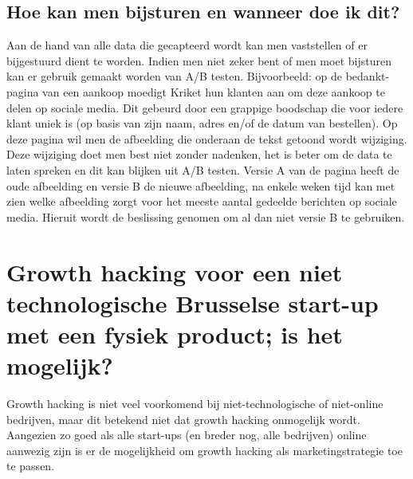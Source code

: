 \subsection{Hoe kan men bijsturen en wanneer doe ik dit?}
\label{subsec:growth-hack-bijsturen}
Aan de hand van alle data die gecapteerd wordt kan men vaststellen of er bijgestuurd dient te worden. Indien men niet zeker bent of men moet bijsturen kan er gebruik gemaakt worden van A/B testen. Bijvoorbeeld: op de bedankt-pagina van een aankoop moedigt Kriket hun klanten aan om deze aankoop te delen op sociale media. Dit gebeurd door een grappige boodschap die voor iedere klant uniek is (op basis van zijn naam, adres en/of de datum van bestellen). Op deze pagina wil men de afbeelding die onderaan de tekst getoond wordt wijziging. Deze wijziging doet men best niet zonder nadenken, het is beter om de data te laten spreken en dit kan blijken uit A/B testen. Versie A van de pagina heeft de oude afbeelding en versie B de nieuwe afbeelding, na enkele weken tijd kan met zien welke afbeelding zorgt voor het meeste aantal gedeelde berichten op sociale media. Hieruit wordt de beslissing genomen om al dan niet versie B te gebruiken.
 
\section{Growth hacking voor een niet technologische Brusselse start-up met een fysiek product; is het mogelijk?}
\label{sec:growth-hacking-mogelijk}
Growth hacking is niet veel voorkomend bij niet-technologische of niet-online bedrijven, maar dit betekend niet dat growth hacking onmogelijk wordt. Aangezien zo goed als alle start-ups (en breder nog, alle bedrijven) online aanwezig zijn is er de mogelijkheid om growth hacking als marketingstrategie toe te passen. 